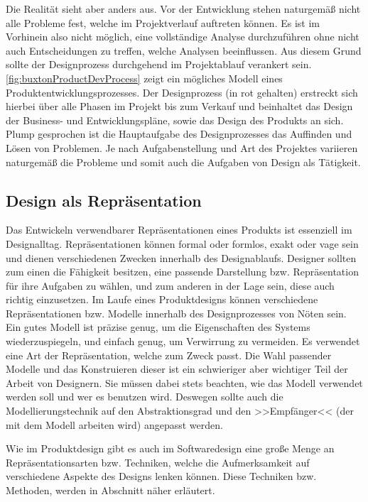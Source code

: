 Die Realität sieht aber anders aus. Vor der Entwicklung stehen naturgemäß nicht alle Probleme fest, welche im Projektverlauf auftreten können. Es ist im Vorhinein also nicht möglich, eine vollständige Analyse durchzuführen ohne nicht auch Entscheidungen zu treffen, welche Analysen beeinflussen. Aus diesem Grund sollte der Designprozess durchgehend im Projektablauf verankert sein.
\autoref{fig:buxtonProductDevProcess} zeigt ein mögliches Modell eines Produktentwicklungsprozesses. Der Designprozess (in rot gehalten) erstreckt sich hierbei über alle Phasen im Projekt bis zum Verkauf und beinhaltet das Design der Business- und Entwicklungspläne, sowie das Design des Produkts an sich. Plump gesprochen ist die Hauptaufgabe des Designprozesses das Auffinden und Lösen von Problemen. Je nach Aufgabenstellung und Art des Projektes variieren naturgemäß die Probleme und somit auch die Aufgaben von Design als Tätigkeit. \citep{Buxton:2007, Sagmeister:2008}

\subsection{Design als Repräsentation} 
Das Entwickeln verwendbarer Repräsentationen eines Produkts ist essenziell im Designalltag. Repräsentationen können formal oder formlos, exakt oder vage sein und dienen verschiedenen Zwecken innerhalb des Designablaufs. Designer sollten zum einen die Fähigkeit besitzen, eine passende Darstellung bzw. Repräsentation für ihre Aufgaben zu wählen, und zum anderen in der Lage sein, diese auch richtig einzusetzen.
Im Laufe eines Produktdesigns können verschiedene Repräsentationen bzw. Modelle innerhalb des Designprozesses von Nöten sein. Ein gutes Modell ist präzise genug, um die Eigenschaften des Systems wiederzuspiegeln, und einfach genug, um Verwirrung zu vermeiden. Es verwendet eine Art der Repräsentation, welche zum Zweck passt.
Die Wahl passender Modelle und das Konstruieren dieser ist ein schwieriger aber wichtiger Teil der Arbeit von Designern. Sie müssen dabei stets beachten, wie das Modell verwendet werden soll und wer es benutzen wird. Deswegen sollte auch die Modellierungstechnik auf den Abstraktionsgrad und den >>Empfänger<< (der mit dem Modell arbeiten wird) angepasst werden. \citep{Preece:1994}

\medskip Wie im Produktdesign gibt es auch im Softwaredesign eine große Menge an Repräsentationsarten bzw. Techniken, welche die Aufmerksamkeit auf verschiedene Aspekte des Designs lenken können. Diese Techniken bzw. Methoden, werden in Abschnitt  näher erläutert. 

